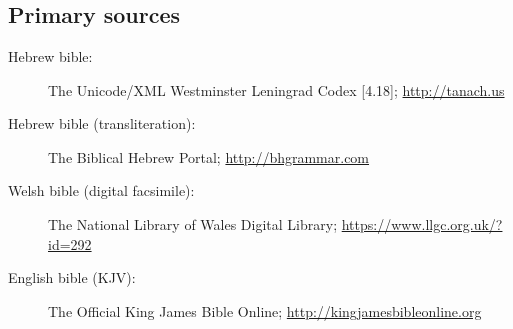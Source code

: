 \nocite{avrahami.y:2012:senses}
\nocite{levy.j:1967:translation}
\nocite{even-shoshan.a:1977:concordance}

\section*{\bibname}

\printbibliography[heading=none]

\subsection*{Primary sources}

\begin{description}
	\item [Hebrew bible:] The Unicode/XML Westminster Leningrad Codex [4.18]; \url{http://tanach.us}
	\item [Hebrew bible (transliteration):] The Biblical Hebrew Portal; \url{http://bhgrammar.com}
	\item [Welsh bible (digital facsimile):] The National Library of Wales Digital Library; \url{https://www.llgc.org.uk/?id=292}
	\item [English bible (KJV):] The Official King James Bible Online; \url{http://kingjamesbibleonline.org}
\end{description}
